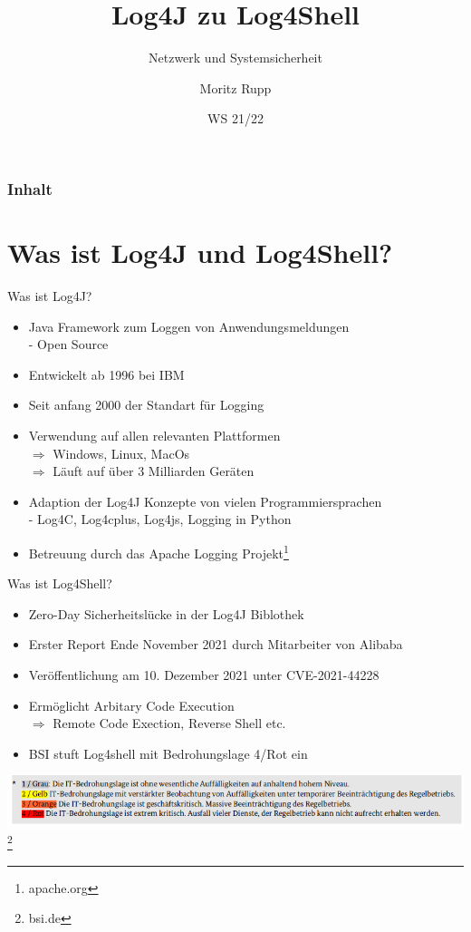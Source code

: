\documentclass{beamer}
\title[Netzwerk und Systemsicherheit]{Log4J zu Log4Shell}
\subtitle{Netzwerk und Systemsicherheit}
\author{Moritz Rupp}
\institute[MR]{Hochschule Albstadt-Sigmaringen}
\date{WS 21/22}
\begin{document}
\begin{frame}
\titlepage
\end{frame}
\begin{frame}
\frametitle{Inhalt}
\tableofcontents    
\end{frame}
\section{Was ist Log4J und Log4Shell?}
\begin{frame}{Was ist Log4J?}
\begin{itemize}
 \item Java Framework zum Loggen von Anwendungsmeldungen\\
 - Open Source
 \item Entwickelt ab 1996 bei IBM
 \item Seit anfang 2000 der Standart für Logging\\
 \item Verwendung auf allen relevanten Plattformen\\
 $\Rightarrow$ Windows, Linux, MacOs\\
 $\Rightarrow$ Läuft auf über 3 Milliarden Geräten
 \item Adaption der Log4J Konzepte von vielen Programmiersprachen\\
 - Log4C, Log4cplus, Log4js, Logging in Python 
 \item Betreuung durch das Apache Logging Projekt\footnote{apache.org}
\end{itemize}
\end{frame}
\begin{frame}{Was ist Log4Shell?}
\begin{itemize}
\item Zero-Day Sicherheitslücke in der Log4J Biblothek
\item Erster Report Ende November 2021 durch Mitarbeiter von Alibaba 
\item Veröffentlichung am 10. Dezember 2021 unter CVE-2021-44228
\item Ermöglicht Arbitary Code Execution\\
$\Rightarrow$ Remote Code Exection, Reverse Shell etc.
\item BSI stuft Log4shell mit Bedrohungslage 4/Rot ein

\end{itemize}
\begin{center}
 \includegraphics[scale=0.35]{bsilog4j.png}\footnote{bsi.de}
\end{center}


 
\end{frame}
\end{document}
